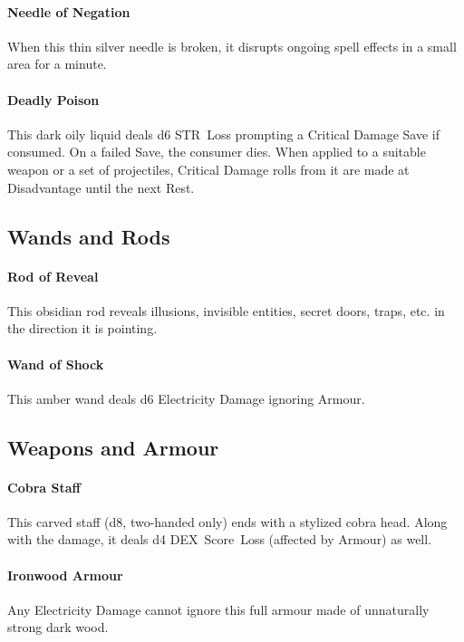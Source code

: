 \documentclass[itdr]{subfiles}
\begin{document}
\paragraph{Needle of Negation}
When this thin silver needle is broken, it disrupts ongoing spell effects in a small area for a minute.

\paragraph{Deadly Poison}
This dark oily liquid deals d6 STR~Loss prompting a Critical Damage Save if consumed. On a failed Save, the consumer dies. When applied to a suitable weapon or a set of projectiles, Critical Damage rolls from it are made at Disadvantage until the next Rest.

\vfill

\subsection*{Wands and Rods}

\paragraph{Rod of Reveal}
This obsidian rod reveals illusions, invisible entities, secret doors, traps, etc. in the direction it is pointing.

\paragraph{Wand of Shock}
This amber wand deals d6 Electricity Damage \mbox{ignoring} Armour.

\vfill

\subsection*{Weapons and Armour}

\paragraph{Cobra Staff}
This carved staff (d8, two-handed only) ends with a stylized cobra head. Along with the damage, it deals d4 DEX~Score~Loss (affected by Armour) as well.

\paragraph{Ironwood Armour}
Any Electricity Damage cannot ignore this full \mbox{armour} made of unnaturally strong dark wood.
\end{document}
